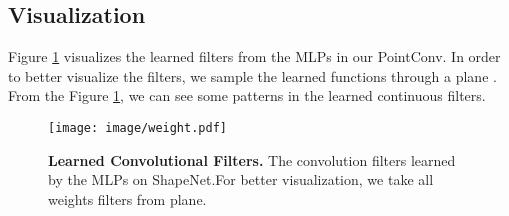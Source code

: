 \documentclass[10pt,twocolumn,letterpaper]{article}
\begin{document}
\begin{comment}
\setlength{\tabcolsep}{4pt}
\begin{table}
	\begin{center}
		\caption{\textbf{Ablation study on ScanNet.} With and without RGB information, inverse density scale and using different stride size of sliding window.}
		\label{table:eval_stride}
		\begin{tabular}{c|c|c}
			\hline\noalign{\smallskip}
			 Input & Stride Size(m) & mIoU\\
			\noalign{\smallskip}
			\hline
			\noalign{\smallskip}
			\multirow{3}{*}{xyz} & 0.5 & 60.4 \\
                                 & 1.0 & 58.5 \\
                                 & 1.5 & 57.9 \\
            \noalign{\smallskip}
			\hline
			\noalign{\smallskip}
			xyz+No density & 1.5 & 56.9 \\
            \noalign{\smallskip}
			\hline
			\noalign{\smallskip}
            \multirow{3}{*}{xyz+RGB} & 0.5 & 60.8 \\
                                 & 1.0 & 58.6\\
                                 & 1.5 & 57.5 \\
			\hline
		\end{tabular}
	\end{center}
	\vskip -0.25in
\end{table}
\setlength{\tabcolsep}{1.4pt}
\end{comment}

\subsection{Visualization}

Figure \ref{fig:weights} visualizes the learned filters from the MLPs in our PointConv. In order to better visualize the filters, we sample the learned functions through a plane . From the Figure \ref{fig:weights}, we can see some patterns in the learned continuous filters.

\begin{figure}
\centering
\texttt{[image: image/weight.pdf]}
\caption{\textbf{Learned Convolutional Filters.} The convolution filters learned by the MLPs on ShapeNet.For better visualization, we take all weights filters from  plane.}
\label{fig:weights}
\vskip -0.15in
\end{figure}
\end{document}

